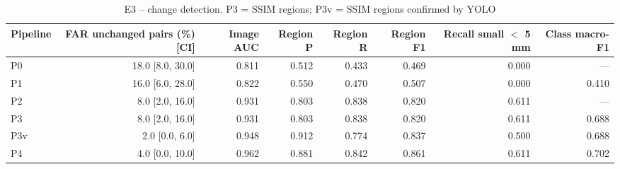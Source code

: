 \begin{table}[t]
\centering
\caption{E3 – change detection. P3 = SSIM regions; P3v = SSIM regions confirmed by YOLO}
\label{tab:e3}
\begin{tabular}{lrrrrrrr}
\toprule
Pipeline & FAR unchanged pairs (\%) [CI] & Image AUC & Region P & Region R & Region F1 & Recall small $<$ 5 mm & Class macro-F1 \\
\midrule
P0 & 18.0 [8.0, 30.0] & 0.811 & 0.512 & 0.433 & 0.469 & 0.000 & --- \\
P1 & 16.0 [6.0, 28.0] & 0.822 & 0.550 & 0.470 & 0.507 & 0.000 & 0.410 \\
P2 & 8.0 [2.0, 16.0] & 0.931 & 0.803 & 0.838 & 0.820 & 0.611 & --- \\
P3 & 8.0 [2.0, 16.0] & 0.931 & 0.803 & 0.838 & 0.820 & 0.611 & 0.688 \\
P3v & 2.0 [0.0, 6.0] & 0.948 & 0.912 & 0.774 & 0.837 & 0.500 & 0.688 \\
P4 & 4.0 [0.0, 10.0] & 0.962 & 0.881 & 0.842 & 0.861 & 0.611 & 0.702 \\
\bottomrule
\end{tabular}
\end{table}
